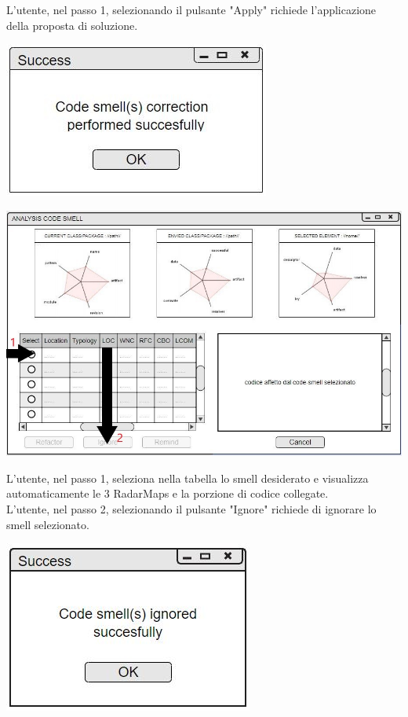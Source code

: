 \documentclass[11pt]{article}
\begin{document}
			\flushleft
			L'utente, nel passo 1, selezionando il pulsante "Apply" richiede l'applicazione della proposta di soluzione.\vspace{0.5cm}
		
			\centering
			\includegraphics[scale=0.9]{pop-up_successo.jpg}\\
			\vspace{0.5cm}
			
			\includegraphics[width=\columnwidth]{mock-up_analisi2.jpg}
			
			\flushleft
			L'utente, nel passo 1, seleziona nella tabella lo smell desiderato e visualizza automaticamente le 3 RadarMaps e la porzione di codice collegate.\\ \vspace{0.2cm}
			L'utente, nel passo 2, selezionando il pulsante "Ignore" richiede di ignorare lo smell selezionato.\vspace{0.5cm}
			
			\centering	
			\includegraphics[scale=0.9]{pop_up_ignore.jpg}\\
			
\end{document}
